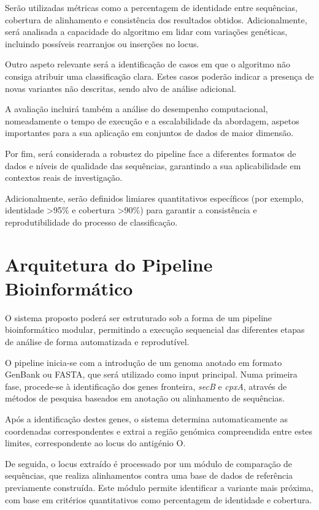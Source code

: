 \documentclass[a4paper,11pt]{article}
\begin{document}
Serão utilizadas métricas como a percentagem de identidade entre sequências, cobertura de alinhamento e consistência dos resultados obtidos. Adicionalmente, será analisada a capacidade do algoritmo em lidar com variações genéticas, incluindo possíveis rearranjos ou inserções no locus.

Outro aspeto relevante será a identificação de casos em que o algoritmo não consiga atribuir uma classificação clara. Estes casos poderão indicar a presença de novas variantes não descritas, sendo alvo de análise adicional.

A avaliação incluirá também a análise do desempenho computacional, nomeadamente o tempo de execução e a escalabilidade da abordagem, aspetos importantes para a sua aplicação em conjuntos de dados de maior dimensão.

Por fim, será considerada a robustez do pipeline face a diferentes formatos de dados e níveis de qualidade das sequências, garantindo a sua aplicabilidade em contextos reais de investigação.

Adicionalmente, serão definidos limiares quantitativos específicos (por exemplo, identidade >95\% e cobertura >90\%) para garantir a consistência e reprodutibilidade do processo de classificação.

\section{Arquitetura do Pipeline Bioinformático}

O sistema proposto poderá ser estruturado sob a forma de um pipeline bioinformático modular, permitindo a execução sequencial das diferentes etapas de análise de forma automatizada e reprodutível.

O pipeline inicia-se com a introdução de um genoma anotado em formato GenBank ou FASTA, que será utilizado como input principal. Numa primeira fase, procede-se à identificação dos genes fronteira, \textit{secB} e \textit{cpxA}, através de métodos de pesquisa baseados em anotação ou alinhamento de sequências.

Após a identificação destes genes, o sistema determina automaticamente as coordenadas correspondentes e extrai a região genómica compreendida entre estes limites, correspondente ao locus do antigénio O.

De seguida, o locus extraído é processado por um módulo de comparação de sequências, que realiza alinhamentos contra uma base de dados de referência previamente construída. Este módulo permite identificar a variante mais próxima, com base em critérios quantitativos como percentagem de identidade e cobertura.
\end{document}
